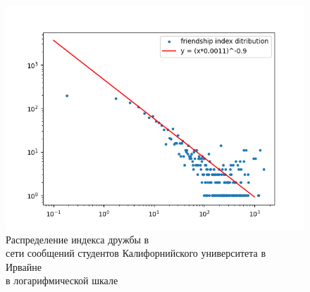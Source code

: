 \documentclass[bachelor, och, diploma]{SCWorks}
\begin{document}
\begin{figure}[!ht]
    \centering
    \includegraphics[scale=0.5]{diploma_results/static_real_log/CollegeMsg.png}
    \caption{Распределение индекса дружбы  в\\ сети сообщений студентов Калифорнийского университета в Ирвайне\\ в логарифмической шкале}
\end{figure}
\end{document}
